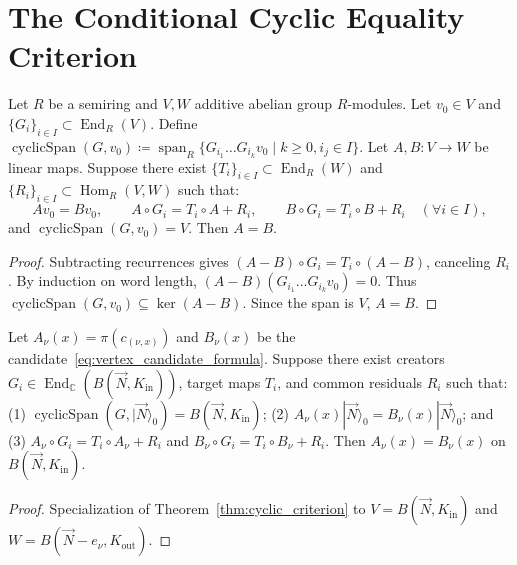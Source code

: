 \section{The Conditional Cyclic Equality Criterion}

\begin{theorem}
\label{thm:cyclic_criterion}
Let $R$ be a semiring and $V, W$ additive abelian group $R$-modules. Let $v_0 \in V$ and $\{G_i\}_{i \in I} \subset \operatorname{End}_R(V)$.
Define $\operatorname{cyclicSpan}(G, v_0) \coloneqq \operatorname{span}_R \{ G_{i_1} \dots G_{i_k} v_0 \mid k \ge 0, i_j \in I \}$.
Let $A, B : V \to W$ be linear maps. Suppose there exist $\{T_i\}_{i \in I} \subset \operatorname{End}_R(W)$ and $\{R_i\}_{i \in I} \subset \operatorname{Hom}_R(V, W)$ such that:
\begin{equation}
A v_0 = B v_0, \qquad A \circ G_i = T_i \circ A + R_i, \qquad B \circ G_i = T_i \circ B + R_i \quad (\forall i \in I),
\end{equation}
and $\operatorname{cyclicSpan}(G, v_0) = V$. Then $A = B$.
\end{theorem}

\begin{proof}
Subtracting recurrences gives $(A - B) \circ G_i = T_i \circ (A - B)$, canceling $R_i$.
By induction on word length, $(A - B)(G_{i_1} \dots G_{i_k} v_0) = 0$.
Thus $\operatorname{cyclicSpan}(G, v_0) \subseteq \ker(A - B)$. Since the span is $V$, $A = B$.
\end{proof}

\begin{theorem}
\label{thm:field_vertex_conditional}
Let $A_\nu(x) = \pi(c_{(\nu, x)})$ and $B_\nu(x)$ be the candidate~\eqref{eq:vertex_candidate_formula}.
Suppose there exist creators $G_i \in \operatorname{End}_{\mathbb{C}}(B(\vec{N}, K_{\mathrm{in}}))$, target maps $T_i$, and common residuals $R_i$ such that:
(1) $\operatorname{cyclicSpan}(G, |\vec{N}\rangle_0) = B(\vec{N}, K_{\mathrm{in}})$;
(2) $A_\nu(x) |\vec{N}\rangle_0 = B_\nu(x) |\vec{N}\rangle_0$; and
(3) $A_\nu \circ G_i = T_i \circ A_\nu + R_i$ and $B_\nu \circ G_i = T_i \circ B_\nu + R_i$.
Then $A_\nu(x) = B_\nu(x)$ on $B(\vec{N}, K_{\mathrm{in}})$.
\end{theorem}

\begin{proof}
Specialization of Theorem~\ref{thm:cyclic_criterion} to $V = B(\vec{N}, K_{\mathrm{in}})$ and $W = B(\vec{N}-e_\nu, K_{\mathrm{out}})$.
\end{proof}

